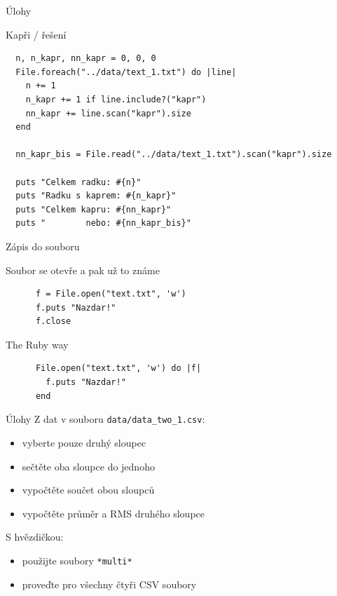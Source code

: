 \documentclass{beamer}
\begin{document}
\begin{frame}[fragile]{Úlohy}
  \begin{block}{Kapři / řešení}
    \tiny
\begin{verbatim}
  n, n_kapr, nn_kapr = 0, 0, 0
  File.foreach("../data/text_1.txt") do |line|
    n += 1
    n_kapr += 1 if line.include?("kapr")
    nn_kapr += line.scan("kapr").size
  end

  nn_kapr_bis = File.read("../data/text_1.txt").scan("kapr").size

  puts "Celkem radku: #{n}"
  puts "Radku s kaprem: #{n_kapr}"
  puts "Celkem kapru: #{nn_kapr}"
  puts "        nebo: #{nn_kapr_bis}"
\end{verbatim}
  \end{block}
\end{frame}

\begin{frame}[fragile]{Zápis do souboru}
  \begin{block}{Soubor se otevře a pak už to známe}
    \begin{verbatim}
      f = File.open("text.txt", 'w')
      f.puts "Nazdar!"
      f.close
    \end{verbatim}
  \end{block}
  \pause
  \begin{block}{The Ruby way}
    \begin{verbatim}
      File.open("text.txt", 'w') do |f|
        f.puts "Nazdar!"
      end
    \end{verbatim}
  \end{block}
\end{frame}

\begin{frame}{Úlohy}
  Z dat v souboru \texttt{data/data\_two\_1.csv}:
  \begin{itemize}
    \item vyberte pouze druhý sloupec
    \item sečtěte oba sloupce do jednoho
    \item vypočtěte součet obou sloupců
    \item vypočtěte průměr a RMS druhého sloupce
  \end{itemize}
  S hvězdičkou:
  \begin{itemize}
    \item použijte soubory \texttt{*multi*}
    \item proveďte pro všechny čtyři CSV soubory
  \end{itemize}
\end{frame}
\end{document}
